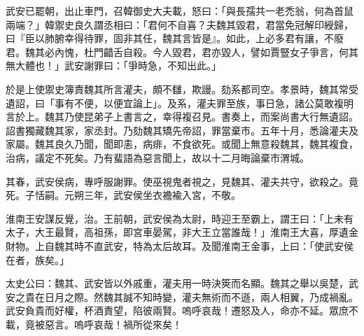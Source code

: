 \begin{pinyinscope}
武安已罷朝，出止車門，召韓御史大夫載，怒曰：「與長孺共一老禿翁，何為首鼠兩端？」韓禦史良久謂丞相曰：「君何不自喜？夫魏其毀君，君當免冠解印綬歸，曰『臣以肺腑幸得待罪，固非其任，魏其言皆是』。如此，上必多君有讓，不廢君。魏其必內愧，杜門齰舌自殺。今人毀君，君亦毀人，譬如賈豎女子爭言，何其無大體也！」武安謝罪曰：「爭時急，不知出此。」

於是上使禦史簿責魏其所言灌夫，頗不讎，欺謾。劾系都司空。孝景時，魏其常受遺詔，曰「事有不便，以便宜論上」。及系，灌夫罪至族，事日急，諸公莫敢複明言於上。魏其乃使昆弟子上書言之，幸得複召見。書奏上，而案尚書大行無遺詔。詔書獨藏魏其家，家丞封。乃劾魏其矯先帝詔，罪當棄市。五年十月，悉論灌夫及家屬。魏其良久乃聞，聞即恚，病痱，不食欲死。或聞上無意殺魏其，魏其複食，治病，議定不死矣。乃有蜚語為惡言聞上，故以十二月晦論棄市渭城。

其春，武安侯病，專呼服謝罪。使巫視鬼者視之，見魏其、灌夫共守，欲殺之。竟死。子恬嗣。元朔三年，武安侯坐衣襜褕入宮，不敬。

淮南王安謀反覺，治。王前朝，武安侯為太尉，時迎王至霸上，謂王曰：「上未有太子，大王最賢，高祖孫，即宮車晏駕，非大王立當誰哉！」淮南王大喜，厚遺金財物。上自魏其時不直武安，特為太后故耳。及聞淮南王金事，上曰：「使武安侯在者，族矣。」

太史公曰：魏其、武安皆以外戚重，灌夫用一時決筴而名顯。魏其之舉以吳楚，武安之貴在日月之際。然魏其誠不知時變，灌夫無術而不遜，兩人相翼，乃成禍亂。武安負貴而好權，杯酒責望，陷彼兩賢。嗚呼哀哉！遷怒及人，命亦不延。眾庶不載，竟被惡言。嗚呼哀哉！禍所從來矣！


\end{pinyinscope}